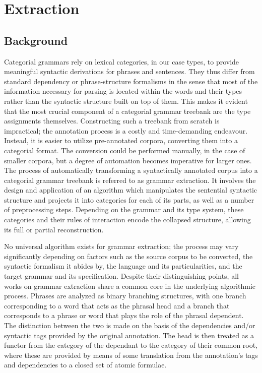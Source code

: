 \chapter{Extraction}
\label{chapter:extraction}

\section{Background}
Categorial grammars rely on lexical categories, in our case types, to provide meaningful syntactic derivations for phrases and sentences.
They thus differ from standard dependency or phrase-structure formalisms in the sense that most of the information necessary for parsing is located within the words and their types rather than the syntactic structure built on top of them.
This makes it evident that the most crucial component of a categorial grammar treebank are the type assignments themselves.
Constructing such a treebank from scratch is impractical; the annotation process is a costly and time-demanding endeavour. 
Instead, it is easier to utilize pre-annotated corpora, converting them into a categorial format.
The conversion could be performed manually, in the case of smaller corpora, but a degree of automation becomes imperative for larger ones.
The process of automatically transforming a syntactically annotated corpus into a categorial grammar treebank is referred to as grammar extraction.
It involves the design and application of an algorithm which manipulates the sentential syntactic structure and projects it into categories for each of its parts, as well as a number of preprocessing steps.
Depending on the grammar and its type system, these categories and their rules of interaction encode the collapsed structure, allowing its full or partial reconstruction.

No universal algorithm exists for grammar extraction; the process may vary significantly depending on factors such as the source corpus to be converted, the syntactic formalism it abides by, the language and its particularities, and the target grammar and its specification.
Despite their distinguishing points, all works on grammar extraction share a common core in the underlying algorithmic process.
Phrases are analyzed as binary branching structures, with one branch corresponding to a word that acts as the phrasal head and a branch that corresponds to a phrase or word that plays the role of the phrasal dependent. 
The distinction between the two is made on the basis of the dependencies and/or syntactic tags provided by the original annotation.
The head is then treated as a functor from the category of the dependant to the category of their common root, where these are provided by means of some translation from the annotation's tags and dependencies to a closed set of atomic formulae.

